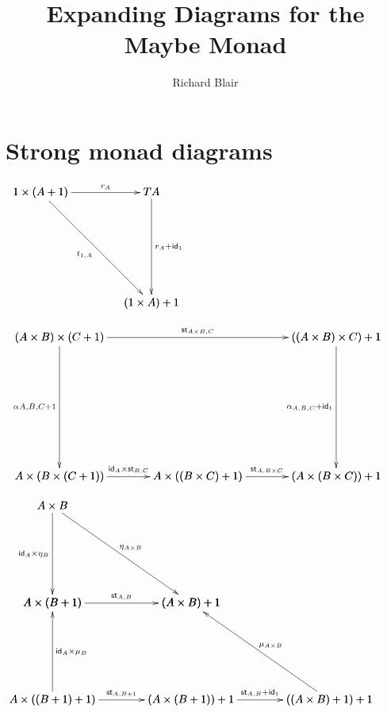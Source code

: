 \documentclass{article}[12pt]
\begin{document}
\newcommand{\id}[0]{\mathsf{id}}
\newcommand{\st}[0]{\mathsf{st}}

\title{Expanding Diagrams for the Maybe Monad}

\author{Richard Blair}

\maketitle

\section{Strong monad diagrams}

  \begin{center}
    \begin{math}
      \bfig
      \scalefactor{2.0}
      \qtriangle[1 \times (A+1)`TA`(1 \times A) + 1;r_A`t_{1,A}`r_{A} + \id_1]
      \efig
    \end{math}
  \end{center}
  \begin{center}
    \begin{math}
      \bfig
      \scalefactor{2.5}
      \node topleft(0,500)[(A \times B) \times (C+1)]
      \node topright(1000,500)[((A \times B) \times C) + 1]
      \node botleft(0,0)[A \times (B \times (C + 1))]
      \node botmid(500,0)[A \times ((B \times C) + 1)]
      \node botright(1000,0)[(A \times (B \times C)) + 1]
      \arrow[topleft`topright;\st_{A \times B, C}]
      \arrow[topright`botright;\alpha_{A,B,C} + \id_1]
      \arrow[topleft`botleft;\alpha{A,B,C+1}]
      \arrow[botleft`botmid; \id_A \times \st_{B, C}]
      \arrow[botmid`botright;\st_{A, B \times C}]
      \efig
    \end{math}
  \end{center}
  \begin{center}
    \begin{math}
      \bfig
      \scalefactor{2.5}%
      \node AxB(0,700)[A \times B]%
      \node AxTB(0,350)[A \times (B + 1)]%
      \node AxT2B(0,0)[A \times ((B + 1) + 1)]%
      \node TAxB(500,350)[(A \times B) + 1]%
      \node TAxTB(500,0)[(A \times (B + 1)) + 1]%
      \node T2AxB(1000,0)[((A \times B) + 1) + 1]%
      \arrow[AxB`AxTB;\id_A \times \eta_B]%
      \arrow[AxT2B`AxTB;\id_A \times \mu_B]%
      \arrow[AxB`TAxB;\eta_{A \times B}]%
      \arrow[AxTB`TAxB;\st_{A,B}]%
      \arrow[AxT2B`TAxTB;\st_{A, B + 1}]%
      \arrow[TAxTB`T2AxB;\st_{A,B} + \id_1]%
      \arrow[T2AxB`TAxB;\mu_{A \times B}]%
      \efig
    \end{math}
  \end{center}
\end{document}
